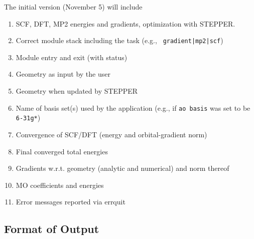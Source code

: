 The initial version (November 5) will include
\begin{enumerate}
\item SCF, DFT, MP2 energies and gradients, optimization with STEPPER.
\item Correct module stack including the task (e.g., {\tt
    gradient|mp2|scf})
\item Module entry and exit (with status)
\item Geometry as input by the user
\item Geometry when updated by STEPPER
\item Name of basis set(s) used by the application (e.g., if {\tt ao
    basis} was set to be \verb+6-31g*+)
\item Convergence of SCF/DFT (energy and orbital-gradient norm)
\item Final converged total energies
\item Gradients w.r.t. geometry (analytic and numerical) and norm thereof
\item MO coefficients and energies
\item Error messages reported via errquit
\end{enumerate}

\subsection{Format of Output}


